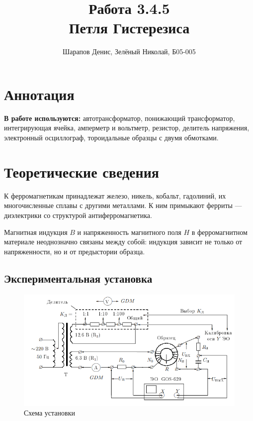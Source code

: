 \documentclass[a4paper]{article}
\title{Работа 3.4.5 \\ Петля Гистерезиса}
\author{Шарапов Денис, Зелёный Николай, Б05-005}
\date{}
\theoremstyle{definition}
\theoremstyle{remark}
\begin{document}
    \maketitle
    \tableofcontents
    \newpage
    
\section{Аннотация}

\noindent \textbf{В работе используются:} автотрансформатор, понижающий трансформатор, интегрирующая ячейка, амперметр и вольтметр, резистор, делитель напряжения, электронный осциллограф, тороидальные образцы с двумя обмотками.
 
\section{Теоретические сведения}

К ферромагнетикам принадлежат железо, никель, кобальт, гадолиний, их многочисленные сплавы с другими металлами. К ним примыкают ферриты --- диэлектрики со структурой антиферромагнетика.

Магнитная индукция \textbf{$B$} и напряженность магнитного поля \textbf{$H$} в ферромагнитном материале неоднозначно связаны между собой: индукция зависит не только от напряженности, но и от предыстории образца.

\subsection{Экспериментальная установка}

\begin{figure}[h!]
    \centering
    \includegraphics[width=\linewidth]{image/pic1.png}
    \caption{Схема установки}
\end{figure}
\end{document}
